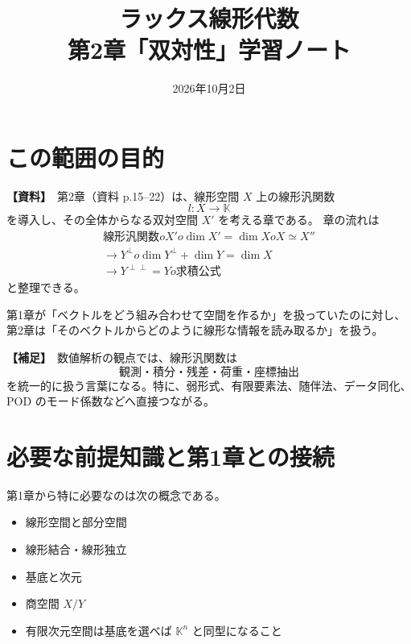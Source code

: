 \documentclass[a4paper,11pt]{ltjsarticle}
\title{\vspace{-1.5em}ラックス線形代数\\第2章「双対性」学習ノート}
\author{}
\date{2026年10月2日}
\newcommand{\K}{\mathbb{K}}
\newcommand{\sourceitem}{\textbf{【資料】}}
\newcommand{\suppitem}{\textbf{【補足】}}
\begin{document}
\maketitle
\vspace{-2em}

\begin{center}
\end{center}

\section{この範囲の目的}

\sourceitem\ 第2章（資料 p.15--22）は、線形空間 $X$ 上の線形汎関数
\[
 l:X\to\K
\]
を導入し、その全体からなる双対空間 $X'$ を考える章である。
章の流れは
\[
\boxed{
\begin{array}{c}
\text{線形汎関数}	o X'	o \dim X'=\dim X	o X\simeq X''\\[2pt]
\to Y^\perp	o \dim Y^\perp+\dim Y=\dim X\\[2pt]
\to Y^{\perp\perp}=Y	o \text{求積公式}
\end{array}
}
\]
と整理できる。

第1章が「ベクトルをどう組み合わせて空間を作るか」を扱っていたのに対し、
第2章は「そのベクトルからどのように線形な情報を読み取るか」を扱う。

\suppitem\ 数値解析の観点では、線形汎関数は
\[
\boxed{\text{観測・積分・残差・荷重・座標抽出}}
\]
を統一的に扱う言葉になる。特に、弱形式、有限要素法、随伴法、データ同化、POD のモード係数などへ直接つながる。

\section{必要な前提知識と第1章との接続}

第1章から特に必要なのは次の概念である。
\begin{itemize}
  \item 線形空間と部分空間
  \item 線形結合・線形独立
  \item 基底と次元
  \item 商空間 $X/Y$
  \item 有限次元空間は基底を選べば $\K^n$ と同型になること
\end{itemize}
\end{document}
